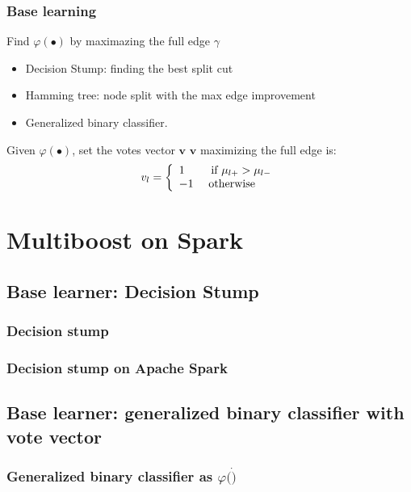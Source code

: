 \documentclass{beamer}
\begin{document}
\begin{frame}
\frametitle{Base learning}

\begin{block}{Find $\varphi(\bullet)$ by maximazing the full edge $\gamma$}
\begin{itemize}
\item Decision Stump: finding the best split cut
\item Hamming tree: node split with the max edge improvement
\item Generalized binary classifier.
\end{itemize}
\end{block}

\begin{block}{Given $\varphi(\bullet)$, set the votes vector $\mathbf{v}$}
$\mathbf{v}$ maximizing the full edge is:
\[v_l = \left\{
  \begin{array}{l l}
  1 \quad \quad \text{   if } \mu_{l+} > \mu_{l-} \\
  -1 \quad \text{ otherwise }
  \end{array} \right. \]
\end{block}

\end{frame}

\section{Multiboost on Spark}

\subsection{Base learner: Decision Stump}

\begin{frame}
\frametitle{Decision stump}
\end{frame}

\begin{frame}
\frametitle{Decision stump on Apache Spark}
\end{frame}

\subsection{Base learner: generalized binary classifier with vote vector}

\begin{frame}
\frametitle{Generalized binary classifier as $\varphi(\dot)$}
\end{frame}
\end{document}
